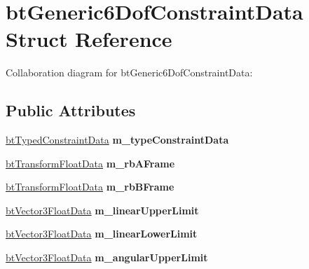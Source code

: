 \hypertarget{structbt_generic6_dof_constraint_data}{\section{bt\+Generic6\+Dof\+Constraint\+Data Struct Reference}
\label{structbt_generic6_dof_constraint_data}
}


Collaboration diagram for bt\+Generic6\+Dof\+Constraint\+Data\+:
\subsection*{Public Attributes}
\begin{DoxyCompactItemize}
\item 
\hypertarget{structbt_generic6_dof_constraint_data_a9ea5c6ab0368141d1213bc5d06498db9}{\hyperlink{structbt_typed_constraint_data}{bt\+Typed\+Constraint\+Data} {\bfseries m\+\_\+type\+Constraint\+Data}}\label{structbt_generic6_dof_constraint_data_a9ea5c6ab0368141d1213bc5d06498db9}

\item 
\hypertarget{structbt_generic6_dof_constraint_data_ae6ba1a602c98f480d2fe00f1c9bc04aa}{\hyperlink{structbt_transform_float_data}{bt\+Transform\+Float\+Data} {\bfseries m\+\_\+rb\+A\+Frame}}\label{structbt_generic6_dof_constraint_data_ae6ba1a602c98f480d2fe00f1c9bc04aa}

\item 
\hypertarget{structbt_generic6_dof_constraint_data_a0a260944a3be8bf2e43e33feb8e09fc0}{\hyperlink{structbt_transform_float_data}{bt\+Transform\+Float\+Data} {\bfseries m\+\_\+rb\+B\+Frame}}\label{structbt_generic6_dof_constraint_data_a0a260944a3be8bf2e43e33feb8e09fc0}

\item 
\hypertarget{structbt_generic6_dof_constraint_data_a92fcacfe88143ac78819fbcc7755c113}{\hyperlink{structbt_vector3_float_data}{bt\+Vector3\+Float\+Data} {\bfseries m\+\_\+linear\+Upper\+Limit}}\label{structbt_generic6_dof_constraint_data_a92fcacfe88143ac78819fbcc7755c113}

\item 
\hypertarget{structbt_generic6_dof_constraint_data_aa34d60cc73104a0a3d35d39cd76242b3}{\hyperlink{structbt_vector3_float_data}{bt\+Vector3\+Float\+Data} {\bfseries m\+\_\+linear\+Lower\+Limit}}\label{structbt_generic6_dof_constraint_data_aa34d60cc73104a0a3d35d39cd76242b3}

\item 
\hypertarget{structbt_generic6_dof_constraint_data_ad73e73ab137dee84edc9056ff08e1384}{\hyperlink{structbt_vector3_float_data}{bt\+Vector3\+Float\+Data} {\bfseries m\+\_\+angular\+Upper\+Limit}}\label{structbt_generic6_dof_constraint_data_ad73e73ab137dee84edc9056ff08e1384}


\end{DoxyCompactItemize}
